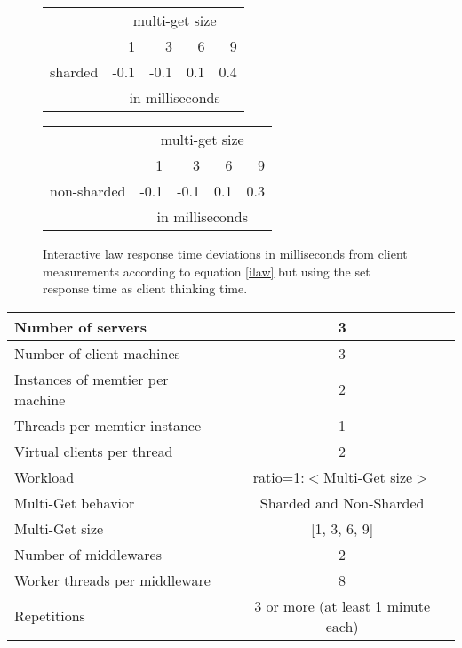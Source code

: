 \documentclass[report.tex]{subfiles}
\begin{document}
\begin{figure}
	\begin{minipage}[c]{0.45\linewidth}
		\centering
		\begin{tabular}{|c|*{4}{r}|}
			\cline{2-5}
			\multicolumn{1}{c|}{} & \multicolumn{4}{c|}{multi-get size} \Tstrut\\
			\multicolumn{1}{c|}{} & 1 & 3 & 6 & 9 \Tstrut\\
			\hline
			sharded & -0.1 & -0.1 & 0.1 & 0.4 \Tstrut\\
			& \multicolumn{4}{c|}{in milliseconds} \\
			\hline 
		\end{tabular}
	\end{minipage}
	\hspace{0.5cm}
	\begin{minipage}[c]{0.45\linewidth}
		\centering
		\begin{tabular}{|c|*{4}{r}|}
			\cline{2-5}
			\multicolumn{1}{c|}{} & \multicolumn{4}{c|}{multi-get size} \Tstrut\\
			\multicolumn{1}{c|}{} & 1 & 3 & 6 & 9 \Tstrut\\
			\hline
			non-sharded & -0.1 & -0.1 & 0.1 & 0.3 \Tstrut\\
			& \multicolumn{4}{c|}{in milliseconds} \\
			\hline 
		\end{tabular}
	\end{minipage}
	\caption{Interactive law response time deviations in milliseconds from client measurements according to equation \ref{ilaw} but using the set response time as client thinking time.}\label{exp5_ilaw}
\end{figure}

\begin{center}
	\scriptsize{
		\begin{tabular}{|l|c|}
			\hline Number of servers                & 3                       \\ 
			\hline Number of client machines        & 3                       \\ 
			\hline Instances of memtier per machine & 2                       \\ 
			\hline Threads per memtier instance     & 1                       \\
			\hline Virtual clients per thread       & 2     		           \\ 
			\hline Workload                         & ratio=1:$<$Multi-Get size$>$         \\
			\hline Multi-Get behavior               & Sharded and Non-Sharded  \\
			\hline Multi-Get size                   & [1, 3, 6, 9]            \\
			\hline Number of middlewares            & 2                       \\
			\hline Worker threads per middleware    & 8 \\
			\hline Repetitions                      & 3 or more (at least 1 minute each)               \\ 
			\hline 
		\end{tabular}
	} 
\end{center}
\end{document}
